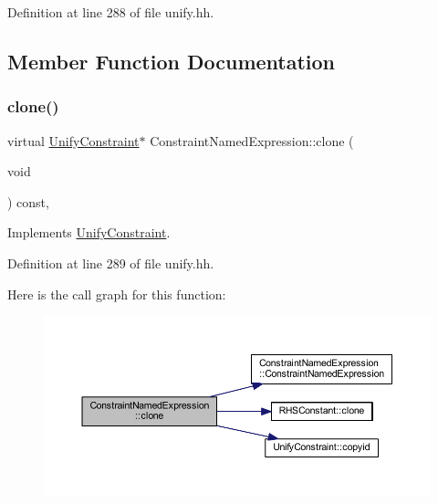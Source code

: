 Definition at line 288 of file unify.\+hh.



\subsection{Member Function Documentation}
\mbox{\label{class_constraint_named_expression_a5bcd0a8233fb0ed71d8ededd4235d74a}} 
\subsubsection{\texorpdfstring{clone()}{clone()}}
{\footnotesize\ttfamily virtual \mbox{\hyperlink{class_unify_constraint}{Unify\+Constraint}}$\ast$ Constraint\+Named\+Expression\+::clone (\begin{DoxyParamCaption}\item[{void}]{ }\end{DoxyParamCaption}) const\hspace{0.3cm}{\ttfamily [inline]}, {\ttfamily [virtual]}}



Implements \mbox{\hyperlink{class_unify_constraint_a4f068343932637d355644bb21559aa12}{Unify\+Constraint}}.



Definition at line 289 of file unify.\+hh.

Here is the call graph for this function\+:
\nopagebreak
\begin{figure}[H]
\begin{center}
\leavevmode
\includegraphics[width=350pt]{class_constraint_named_expression_a5bcd0a8233fb0ed71d8ededd4235d74a_cgraph}
\end{center}
\end{figure}
\mbox{\label{class_constraint_named_expression_a3624723eef17793ebfb9c3af103b09ec}} 

